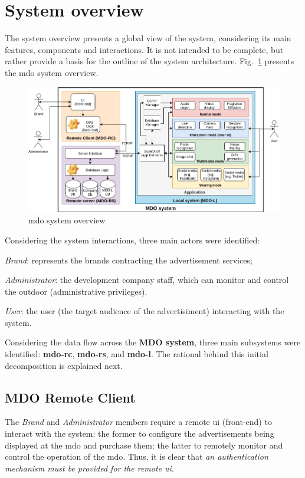 %
\section{System overview}
\label{sec:system-overview}
The system overview presents a global view of the system, considering its main
features, components and interactions. It is not intended to be complete, but
rather provide a basis for the outline of the system architecture.
Fig.~\ref{fig:sys-overview} presents the \gls{mdo} system overview.
%
\begin{figure}[htb!]
\centering
    \includegraphics[width=1.0\columnwidth]{./img/sys-overview.png}
  \caption{\gls{mdo} system overview}%
\label{fig:sys-overview}
\end{figure}

Considering the system interactions, three main actors were identified:
\begin{enum-c}
\item \emph{Brand}: represents the brands contracting the advertisement
  services;
\item \emph{Administrator}: the development company staff, which can monitor and
  control the outdoor (administrative privileges).
\item \emph{User}: the user (the target audience of the advertisiment)
  interacting with the system.
\end{enum-c}

Considering the data flow across the \textbf{MDO system}, three main subsystems were
identified: \textbf{\gls{mdo-rc}}, \textbf{\gls{mdo-rs}}, and
\textbf{\gls{mdo-l}}. The rational behind this initial decomposition is
explained next.

\subsection{MDO Remote Client}
The \emph{Brand} and \emph{Administrator} members require a remote \gls{ui} (front-end) to
interact with the system: the former to configure the advertisements being
displayed at the \gls{mdo} and purchase them; the latter to remotely monitor and
control the operation of the \gls{mdo}. Thus, it is clear that \emph{an
  authentication mechanism must be provided for the remote \gls{ui}}.

